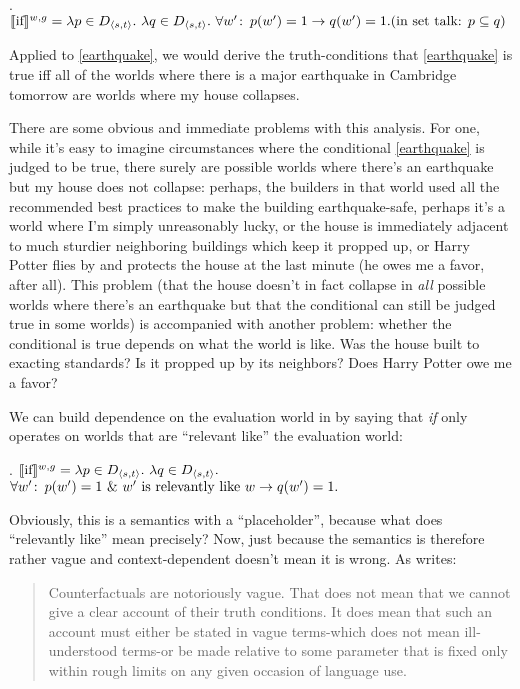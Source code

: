 \ex. $\llbracket \mbox{if} \rrbracket^{w,g} = \lambda p \in D_{\langle s,t \rangle}.\ \lambda q \in D_{\langle s,t \rangle}.\ \forall w'\colon\thinspace p(w')=1 \rightarrow q(w')=1.\\[6pt]
(\mbox{in set talk: } p \subseteq q)$

Applied to \ref{earthquake}, we would derive the truth-conditions that \ref{earthquake} is true iff all of the worlds where there is a major earthquake in Cambridge tomorrow are worlds where my house collapses.

There are some obvious and immediate problems with this analysis. For one, while
it's easy to imagine circumstances where the conditional \ref{earthquake} is
judged to be true, there surely are possible worlds where there's an earthquake
but my house does not collapse: perhaps, the builders in that world used all the
recommended best practices to make the building earthquake-safe, perhaps it's a
world where I'm simply unreasonably lucky, or the house is immediately adjacent
to much sturdier neighboring buildings which keep it propped up, or Harry Potter
flies by and protects the house at the last minute (he owes me a favor, after
all). This problem (that the house doesn't in fact collapse in \emph{all}
possible worlds where there's an earthquake but that the conditional can still
be judged true in some worlds) is accompanied with another problem: whether the
conditional is true depends on what the world is like. Was the house built to
exacting standards? Is it propped up by its neighbors? Does Harry Potter owe me
a favor?

We can build dependence on the evaluation world in by saying that \emph{if} only
operates on worlds that are ``relevant like'' the evaluation world:

\ex.\label{ex:if-strict-context} $\llbracket \mbox{if} \rrbracket^{w,g} = \lambda p \in D_{\langle s,t \rangle}.\ \lambda q \in
D_{\langle s,t \rangle}.$ \\ \null\hfill $\forall w'\colon\thinspace p(w')=1\ \&\ w' \text{ is
  relevantly like } w \rightarrow q(w')=1.$

Obviously, this is a semantics with a ``placeholder'', because what does
``relevantly like'' mean precisely? Now, just because the semantics is therefore
rather vague and context-dependent doesn't mean it is wrong. As
\textcite{lewis:1973:counterfactuals} writes:

\begin{quote} Counterfactuals are notoriously vague. That does not mean that we
cannot give a clear account of their truth conditions. It does mean that such an
account must either be stated in vague terms-which does not mean ill-understood
terms-or be made relative to some parameter that is fixed only within rough
limits on any given occasion of language use.
\end{quote}

